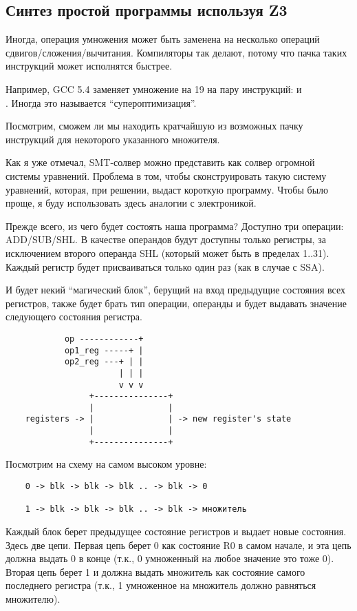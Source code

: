 \subsection{Синтез простой программы используя Z3}

Иногда, операция умножения может быть заменена на несколько операций сдвигов/сложения/вычитания.
Компиляторы так делают, потому что пачка таких инструкций может исполнятся быстрее.

Например, GCC 5.4 заменяет умножение на 19 на пару инструкций:  и\\
.
Иногда это называется ``супероптимизация''.

Посмотрим, сможем ли мы находить кратчайшую из возможных пачку инструкций для некоторого указанного множителя.

Как я уже отмечал, SMT-солвер можно представить как солвер огромной системы уравнений.
Проблема в том, чтобы сконструировать такую систему уравнений, которая, при решении, выдаст короткую программу.
Чтобы было проще, я буду использовать здесь аналогии с электроникой.

Прежде всего, из чего будет состоять наша программа? Доступно три операции: ADD/SUB/SHL.
В качестве операндов будут доступны только регистры, за исключением второго операнда SHL
(который может быть в пределах 1..31).
Каждый регистр будет присваиваться только один раз (как в случае с \ac{SSA}).

И будет некий ``магический блок'', берущий на вход предыдущие состояния всех регистров, также будет брать тип операции,
операнды и будет выдавать значение следующего состояния регистра.

\begin{lstlisting}
	        op ------------+
	        op1_reg -----+ |
	        op2_reg ---+ | |
	                   | | |
	                   v v v
	             +---------------+
	             |               |
	registers -> |               | -> new register's state
	             |               |
	             +---------------+
\end{lstlisting}

Посмотрим на схему на самом высоком уровне:

\begin{lstlisting}
	0 -> blk -> blk -> blk .. -> blk -> 0

	1 -> blk -> blk -> blk .. -> blk -> множитель
\end{lstlisting}

Каждый блок берет предыдущее состояние регистров и выдает новые состояния.
Здесь две цепи.
Первая цепь берет 0 как состояние R0 в самом начале, и эта цепь должна выдать 0 в конце
(т.к., 0 умноженный на любое значение это тоже 0).
Вторая цепь берет 1 и должна выдать множитель как состояние самого последнего регистра
(т.к., 1 умноженное на множитель должно равняться множителю).

